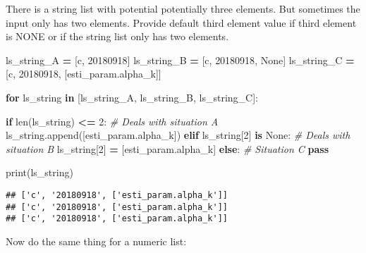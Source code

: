 \documentclass[
]{book}
\newenvironment{Shaded}{\begin{snugshade}}{\end{snugshade}}
\newcommand{\BuiltInTok}[1]{#1}
\newcommand{\CommentTok}[1]{\textcolor[rgb]{0.56,0.35,0.01}{\textit{#1}}}
\newcommand{\ControlFlowTok}[1]{\textcolor[rgb]{0.13,0.29,0.53}{\textbf{#1}}}
\newcommand{\DecValTok}[1]{\textcolor[rgb]{0.00,0.00,0.81}{#1}}
\newcommand{\KeywordTok}[1]{\textcolor[rgb]{0.13,0.29,0.53}{\textbf{#1}}}
\newcommand{\NormalTok}[1]{#1}
\newcommand{\OperatorTok}[1]{\textcolor[rgb]{0.81,0.36,0.00}{\textbf{#1}}}
\newcommand{\StringTok}[1]{\textcolor[rgb]{0.31,0.60,0.02}{#1}}
\newcommand{\VariableTok}[1]{\textcolor[rgb]{0.00,0.00,0.00}{#1}}
\begin{document}
There is a string list with potential potentially three elements. But sometimes the input only has two elements. Provide default third element value if third element is NONE or if the string list only has two elements.

\begin{Shaded}
\begin{Highlighting}[]

\NormalTok{ls\_string\_A }\OperatorTok{=}\NormalTok{ [}\StringTok{\textquotesingle{}c\textquotesingle{}}\NormalTok{, }\StringTok{\textquotesingle{}20180918\textquotesingle{}}\NormalTok{]}
\NormalTok{ls\_string\_B }\OperatorTok{=}\NormalTok{ [}\StringTok{\textquotesingle{}c\textquotesingle{}}\NormalTok{, }\StringTok{\textquotesingle{}20180918\textquotesingle{}}\NormalTok{, }\VariableTok{None}\NormalTok{]}
\NormalTok{ls\_string\_C }\OperatorTok{=}\NormalTok{ [}\StringTok{\textquotesingle{}c\textquotesingle{}}\NormalTok{, }\StringTok{\textquotesingle{}20180918\textquotesingle{}}\NormalTok{, [}\StringTok{\textquotesingle{}esti\_param.alpha\_k\textquotesingle{}}\NormalTok{]]}

\ControlFlowTok{for}\NormalTok{ ls\_string }\KeywordTok{in}\NormalTok{ [ls\_string\_A, ls\_string\_B, ls\_string\_C]:}

  \ControlFlowTok{if} \BuiltInTok{len}\NormalTok{(ls\_string) }\OperatorTok{\textless{}=} \DecValTok{2}\NormalTok{:}
    \CommentTok{\# Deals with situation A}
\NormalTok{    ls\_string.append([}\StringTok{\textquotesingle{}esti\_param.alpha\_k\textquotesingle{}}\NormalTok{])}
  \ControlFlowTok{elif}\NormalTok{ ls\_string[}\DecValTok{2}\NormalTok{] }\KeywordTok{is} \VariableTok{None}\NormalTok{:}
    \CommentTok{\# Deals with situation B}
\NormalTok{    ls\_string[}\DecValTok{2}\NormalTok{] }\OperatorTok{=}\NormalTok{ [}\StringTok{\textquotesingle{}esti\_param.alpha\_k\textquotesingle{}}\NormalTok{]}
  \ControlFlowTok{else}\NormalTok{:}
    \CommentTok{\# Situation C}
    \ControlFlowTok{pass}

  \BuiltInTok{print}\NormalTok{(ls\_string)}
\end{Highlighting}
\end{Shaded}

\begin{verbatim}
## ['c', '20180918', ['esti_param.alpha_k']]
## ['c', '20180918', ['esti_param.alpha_k']]
## ['c', '20180918', ['esti_param.alpha_k']]
\end{verbatim}

Now do the same thing for a numeric list:
\end{document}
